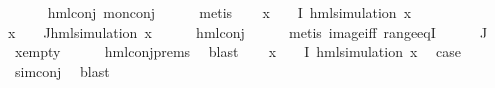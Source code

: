\begin{isabellebody}
\ \ \ \ \isamarkupfalse%
\ hml{\isacharunderscore}{\kern0pt}conj\ mon{\isacharunderscore}{\kern0pt}conj\isanewline
\ \ \ \ \isamarkupfalse%
\ metis{\isacharplus}{\kern0pt}\isanewline
\ \ \isamarkupfalse%
\ {\isachardoublequoteopen}{\isasymforall}x\ {\isasymin}\ {\isacharparenleft}{\kern0pt}{\isasymPhi}\ {\isacharbackquote}{\kern0pt}\ I{\isacharparenright}{\kern0pt}{\isachardot}{\kern0pt}\ hml{\isacharunderscore}{\kern0pt}simulation\ x{\isachardoublequoteclose}\isanewline
{\isachardoublequoteopen}{\isasymforall}x\ {\isasymin}\ {\isacharparenleft}{\kern0pt}{\isasymPhi}\ {\isacharbackquote}{\kern0pt}\ J{\isacharparenright}{\kern0pt}{\isachardot}{\kern0pt}hml{\isacharunderscore}{\kern0pt}simulation\ x{\isachardoublequoteclose}\isanewline
\ \ \ \ \isamarkupfalse%
\ hml{\isacharunderscore}{\kern0pt}conj\isanewline
\ \ \ \ \isamarkupfalse%
\ {\isacharparenleft}{\kern0pt}metis\ image{\isacharunderscore}{\kern0pt}iff\ range{\isacharunderscore}{\kern0pt}eqI{\isacharparenright}{\kern0pt}{\isacharplus}{\kern0pt}\isanewline
\ \ \isamarkupfalse%
\ {\isachardoublequoteopen}{\isasymPhi}\ {\isacharbackquote}{\kern0pt}\ J\ {\isacharequal}{\kern0pt}\ {\isacharbraceleft}{\kern0pt}{\isacharbraceright}{\kern0pt}{\isachardoublequoteclose}\ \isamarkupfalse%
\ x{}{\isacharunderscore}{\kern0pt}empty\isanewline
\ \ \ \ \isamarkupfalse%
\ hml{\isacharunderscore}{\kern0pt}conj{\isachardot}{\kern0pt}prems\ \isamarkupfalse%
\ blast\isanewline
\ \ \isamarkupfalse%
\ {\isacartoucheopen}{\isasymforall}x\ {\isasymin}\ {\isacharparenleft}{\kern0pt}{\isasymPhi}\ {\isacharbackquote}{\kern0pt}\ I{\isacharparenright}{\kern0pt}{\isachardot}{\kern0pt}\ hml{\isacharunderscore}{\kern0pt}simulation\ x{\isacartoucheclose}\ \isamarkupfalse%
\ {\isacharquery}{\kern0pt}case\ \isamarkupfalse%
\ sim{\isacharunderscore}{\kern0pt}conj\ \isamarkupfalse%
\ blast\isanewline
{}\isamarkupfalse%
%
\endisatagproof
{\isafoldproof}%
%
\isadelimproof
\isanewline
%
\endisadelimproof
%
\isadelimtheory
\isanewline
%
\endisadelimtheory
%
\isatagtheory
{}\isamarkupfalse%
%
\endisatagtheory
{\isafoldtheory}%
%
\isadelimtheory
%
\endisadelimtheory
%
\end{isabellebody}%
\endinput
